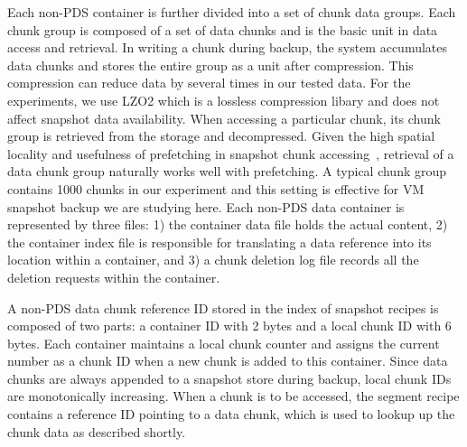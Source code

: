 Each non-PDS container is further divided into a set of chunk data groups. Each chunk group is composed of
a set of data chunks and is the basic unit in data access and retrieval. 
In writing a chunk during backup, the system accumulates data chunks and stores the entire
group as a unit after compression. This  compression can reduce data by several times  in our tested data.
For the experiments, we use LZO2 which is a lossless compression libary and does not affect snapshot
data availability. 
When accessing a particular chunk, its chunk group is retrieved from the storage
and decompressed. Given the high spatial locality and usefulness of prefetching  in 
snapshot chunk accessing~\cite{Guo2011,Rhea2008},
retrieval of  a data chunk  group naturally works well with prefetching. 
A  typical chunk group contains 1000 chunks in our experiment and this setting is effective
for VM snapshot backup we are studying here.
Each non-PDS data container is represented by three files:
1) the container data file holds the actual content, 
2) the container index file is responsible for translating a data reference
into its location within a container, and 
3) a chunk deletion log file records all the deletion requests within  the container.

A non-PDS data chunk reference ID stored in the index of snapshot recipes
is composed of two parts: a container ID with 2 bytes and a local chunk ID with 6 bytes.
Each container maintains a local  chunk counter and assigns the current number 
as a chunk ID  when  a new chunk is added to this  container. 
Since data chunks are always appended to a snapshot store during backup, 
local chunk IDs are monotonically increasing.
When a chunk is to be accessed, the segment recipe contains a reference ID pointing to  
a data chunk, which is used to lookup up the chunk data as described shortly.



